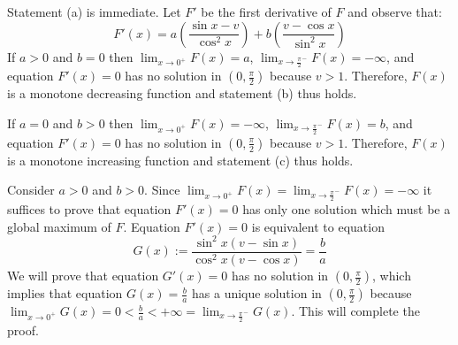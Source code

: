 \documentclass[11pt,a4paper,oneside,onecolumn]{article}
\def\QED{\ensuremath{{\square}}}
\def\markatright#1{\leavevmode\unskip\nobreak\quad\hspace*{\fill}{#1}}
\newenvironment{proof}
{\begin{trivlist}\item[\hskip\labelsep{\bf Proof.}]}
{\markatright{\QED}\end{trivlist}}
\begin{document}
\begin{proof}
Statement (a) is immediate. Let $F'$ be the first derivative of $F$
and observe that:
$$F'(x)=a\left(\frac{\sin x-v}{\cos^2x}\right)+b\left(\frac{v-\cos x}{\sin^2x}\right)$$
If $a>0$ and $b=0$ then $\lim_{x\rightarrow 0^{+}}F(x)=a$,
$\lim_{x\rightarrow \frac{\pi}{2}^{-}}F(x)=-\infty$, and equation
$F'(x)=0$ has no solution in $(0,\frac{\pi}{2})$ because $v>1$.
Therefore, $F(x)$ is a monotone decreasing function and statement
(b) thus holds.

If $a=0$ and $b>0$ then $\lim_{x\rightarrow 0^{+}}F(x)=-\infty$,
$\lim_{x\rightarrow \frac{\pi}{2}^{-}}F(x)=b$, and equation
$F'(x)=0$ has no solution in $(0,\frac{\pi}{2})$ because $v>1$.
Therefore, $F(x)$ is a monotone increasing function and statement (c) thus
holds.

Consider $a>0$ and $b>0$. Since $\lim_{x\rightarrow
0^{+}}F(x)=\lim_{x\rightarrow \frac{\pi}{2}^{-}}F(x)=-\infty$ it
suffices to prove that equation $F'(x)=0$ has only one solution
which must be a global maximum of $F$.
Equation $F'(x)=0$ is equivalent to equation
$$G(x):=\frac{\sin^2x(v-\sin x)}{\cos^2x(v-\cos x)}=\frac{b}{a}$$
We will prove that equation $G'(x)=0$ has no solution in
$(0,\frac{\pi}{2})$, which implies that equation $G(x)=\frac{b}{a}$
has a unique solution in $(0,\frac{\pi}{2})$ because
$\lim_{x\rightarrow
0^+}G(x)=0<\frac{b}{a}<+\infty=\lim_{x\rightarrow
\frac{\pi}{2}^-}G(x)$. This will complete the proof.


\end{proof}
\end{document}
